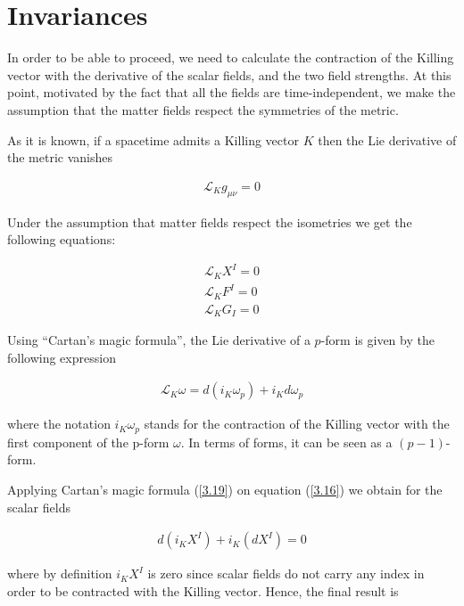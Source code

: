\documentclass[a4paper,notitlepage]{report}
\begin{document}
\section{Invariances}

In order to be able to proceed, we need to calculate the contraction of the Killing vector with the derivative of the scalar fields, and the two field strengths. At this point, motivated by the fact that all the fields are time-independent, we make the assumption that the matter fields respect the symmetries of the metric. 

As it is known, if a spacetime admits a Killing vector $K$ then the Lie derivative of the metric vanishes

\begin{align} \label{3.15}
\mathcal{L}_{K} g_{\mu\nu} = 0
\end{align}

\vspace{0.5em}
Under the assumption that matter fields respect the isometries we get the following equations:

\begin{align} 
\mathcal{L}_{K} X^I = 0 \label{3.16}\\
\mathcal{L}_{K} F^I = 0 \label{3.17} \\
\mathcal{L}_{K} G_I = 0 \label{3.18}
\end{align}

\vspace{0.5em}
Using ``Cartan's magic formula'', the Lie derivative of a $p$-form is given by the following expression

\begin{align} \label{3.19}
\mathcal{L}_{K} \omega = d(i_{K} \omega_p)  + i_{K} d\omega_p
\end{align}

\vspace{0.5 em}
where the notation $i_{K}\omega_p$ stands for the contraction of the Killing vector with the first component of the p-form $\omega$. In terms of forms, it can be seen as a $(p-1)$-form.

Applying Cartan's magic formula (\ref{3.19}) on equation (\ref{3.16}) we obtain for the scalar fields

\begin{align}\label{3.20}
d(i_{K} X^I )  + i_{K} (d X^I) = 0
\end{align}

\vspace{0.5em}
where by definition $i_{K} X^I$ is zero since scalar fields do not carry any index in order to be contracted with the Killing vector. Hence, the final result is
\end{document}
